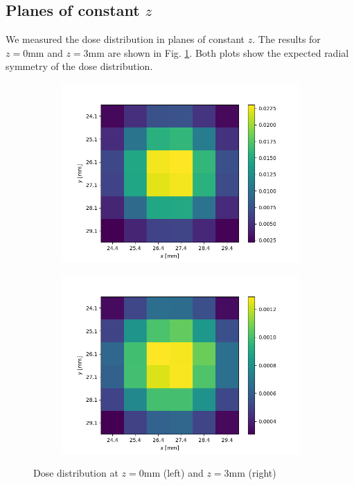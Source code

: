 \documentclass[a4paper,parskip]{scrartcl}
\begin{document}
\subsection{Planes of constant $z$}

We measured the dose distribution in planes of constant $z$. The results for $z=0\mathrm{mm}$ and $z=3\mathrm{mm}$ are shown in Fig. \ref{2D Plots}. Both plots show the expected radial symmetry of the dose distribution.

\begin{figure}
\centering
\begin{subfigure}{0.49\linewidth}
\includegraphics[width = \linewidth]{2D_Dose_Z0.png}
\end{subfigure}
\begin{subfigure}{0.49\linewidth}
\includegraphics[width = \linewidth]{2D_Dose_Z3.png}
\end{subfigure}
\caption{Dose distribution at $z=0\mathrm{mm}$ (left) and $z=3\mathrm{mm}$ (right)}
\label{2D Plots}
\end{figure}
\end{document}
